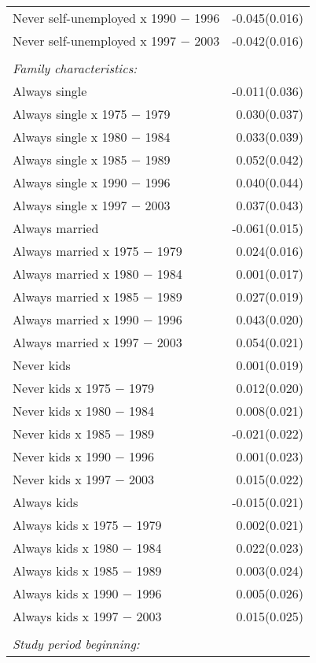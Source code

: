 \begin{tabular}{@{\extracolsep{5pt}}lD{.}{.}{-3} }
  Never self-unemployed x 1990 $-$ 1996 & -0.045$ $(0.016) \\ 
  Never self-unemployed x 1997 $-$ 2003 & -0.042$ $(0.016) \\ 
  & \\ 
                  \emph{Family characteristics:} & \\
                  Always single & -0.011$ $(0.036) \\ 
  Always single x 1975 $-$ 1979 & 0.030$ $(0.037) \\ 
  Always single x 1980 $-$ 1984 & 0.033$ $(0.039) \\ 
  Always single x 1985 $-$ 1989 & 0.052$ $(0.042) \\ 
  Always single x 1990 $-$ 1996 & 0.040$ $(0.044) \\ 
  Always single x 1997 $-$ 2003 & 0.037$ $(0.043) \\ 
  Always married & -0.061$ $(0.015) \\ 
  Always married x 1975 $-$ 1979 & 0.024$ $(0.016) \\ 
  Always married x 1980 $-$ 1984 & 0.001$ $(0.017) \\ 
  Always married x 1985 $-$ 1989 & 0.027$ $(0.019) \\ 
  Always married x 1990 $-$ 1996 & 0.043$ $(0.020) \\ 
  Always married x 1997 $-$ 2003 & 0.054$ $(0.021) \\ 
  Never kids & 0.001$ $(0.019) \\ 
  Never kids x 1975 $-$ 1979 & 0.012$ $(0.020) \\ 
  Never kids x 1980 $-$ 1984 & 0.008$ $(0.021) \\ 
  Never kids x 1985 $-$ 1989 & -0.021$ $(0.022) \\ 
  Never kids x 1990 $-$ 1996 & 0.001$ $(0.023) \\ 
  Never kids x 1997 $-$ 2003 & 0.015$ $(0.022) \\ 
  Always kids & -0.015$ $(0.021) \\ 
  Always kids x 1975 $-$ 1979 & 0.002$ $(0.021) \\ 
  Always kids x 1980 $-$ 1984 & 0.022$ $(0.023) \\ 
  Always kids x 1985 $-$ 1989 & 0.003$ $(0.024) \\ 
  Always kids x 1990 $-$ 1996 & 0.005$ $(0.026) \\ 
  Always kids x 1997 $-$ 2003 & 0.015$ $(0.025) \\ 
  & \\ 
                         \emph{Study period beginning:} & \\

\end{tabular}

